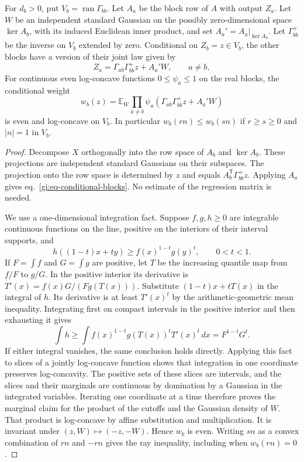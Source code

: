 \documentclass[11pt,letterpaper,reqno]{amsart}
\makeatletter
\numberwithin{equation}{section}
\renewcommand{\eqref}[1]{\textup{eq.~\ref{#1}}}
\theoremstyle{definition}
\newcommand{\ms@minorstart}{%
  \pushQED{\qed}\renewcommand{\qedsymbol}{$\blacksquare$}}
\newenvironment{lemma}[1][]{\ms@minorstart\ms@lemma[#1]}
  {\popQED\endms@lemma}
\theoremstyle{remark}
\makeatother
\begin{document}
\begin{lemma}[Conditional supports and radial weights]
\label{gi:lem-gaussian-radial}
For \(d_b>0\), put \(V_b=\operatorname{ran}\Gamma_{bb}\).
Let $A_a$ be the block row of $A$ with output $Z_a$.
Let $W$ be an independent standard Gaussian on the possibly
zero-dimensional space $\ker A_b$, with its induced Euclidean
inner product, and set $A_a'=A_a|_{\ker A_b}$.
Let \(\Gamma_{bb}^{+}\) be the inverse on \(V_b\) extended
by zero.
Conditional on \(Z_b=z\in V_b\), the other blocks have a
version of their joint law given by
\begin{equation}\label{gi:eq-conditional-blocks}
 Z_a=\Gamma_{ab}\Gamma_{bb}^{+}z+A_a'W,\qquad a\ne b,
\end{equation}
For continuous even log-concave
functions \(0\le\psi_a\le1\) on the real blocks, the conditional
weight
\[
 w_b(z)=\mathbb E_W\prod_{a\ne b}
           \psi_a(\Gamma_{ab}\Gamma_{bb}^{+}z+A_a'W)
\]
is even and log-concave on \(V_b\). In particular
\(w_b(rn)\le w_b(sn)\) if \(r\ge s\ge0\) and \(|n|=1\) in \(V_b\).
\end{lemma}

\begin{proof}
Decompose \(X\) orthogonally into the row space of \(A_b\)
and \(\ker A_b\). These projections are independent standard
Gaussians on their subspaces. The projection onto the row space
is determined by \(z\) and equals
\(A_b^{\mathsf T}\Gamma_{bb}^{+}z\).
Applying \(A_a\) gives \eqref{gi:eq-conditional-blocks}.
No estimate of the regression matrix is needed.

We use a one-dimensional integration fact. Suppose
\(f,g,h\ge0\) are integrable continuous functions on the line,
positive on the interiors of their interval supports, and
\[
 h((1-t)x+ty)\ge f(x)^{1-t}g(y)^t,\qquad 0<t<1.
\]
If \(F=\int f\) and \(G=\int g\) are positive, let \(T\) be
the increasing quantile map from \(f/F\) to \(g/G\).
In the positive interior its derivative is
\(T'(x)=f(x)G/(F g(T(x)))\). Substitute
\((1-t)x+tT(x)\) in the integral of \(h\).
Its derivative is at least \(T'(x)^t\) by the arithmetic-geometric
mean inequality. Integrating first on compact intervals in the
positive interior and then exhausting it gives
\[
 \int h\ge\int f(x)^{1-t}g(T(x))^t T'(x)^t\,dx
                   =F^{1-t}G^t .
\]
If either integral vanishes, the same conclusion holds directly.
Applying this fact to slices of a jointly log-concave function
shows that integration in one coordinate preserves log-concavity.
The positive sets of these slices are intervals, and the slices
and their marginals are continuous by domination by a Gaussian
in the integrated variables. Iterating one coordinate at a time
therefore proves the marginal claim for the product of the
cutoffs and the Gaussian density of \(W\). That product is
log-concave by affine substitution and multiplication. It is
invariant under \((z,W)\mapsto(-z,-W)\). Hence \(w_b\) is even.
Writing \(sn\) as a convex combination of \(rn\) and \(-rn\)
gives the ray inequality, including when \(w_b(rn)=0\).
\end{proof}
\end{document}
